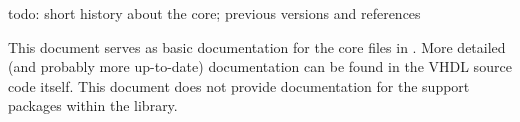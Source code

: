 \documentclass[main.tex]{subfiles}
\begin{document}
todo: short history about the core; previous versions and references

This document serves as basic documentation for the \rvex{} core files in . More detailed (and probably more up-to-date) documentation can be found in the VHDL source code itself. This document does not provide documentation for the support packages within the  library.
\end{document}
